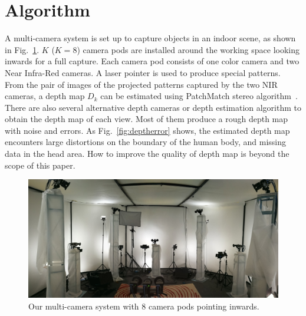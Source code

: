 \section{Algorithm}
\label{sec:overview}

A multi-camera system is set up to capture objects in an indoor scene, as shown in Fig.~\ref{fig:rig}.
%
$K$ ($K=8$) camera pods are installed around the working space looking inwards for a full capture.
Each camera pod consists of one color camera and two Near Infra-Red cameras. A laser pointer is used to produce special patterns. From the pair of images of the projected patterns captured by the two NIR cameras, a depth map $D_k$ can be estimated using PatchMatch stereo algorithm~\cite{Bleyer2011PatchMatch}.
There are also several alternative depth cameras or depth estimation algorithm to obtain the depth map of each view. Most of them produce a rough depth map with noise and errors.
As Fig.~\ref{fig:deptherror} shows, the estimated depth map encounters large distortions on the boundary of the human body, and missing data in the head area.
How to improve the quality of depth map is beyond the scope of this paper.

\begin{figure}
	\centering
	\includegraphics[width=\columnwidth]{image/rig.jpg}
	\caption{Our multi-camera system with 8 camera pods pointing inwards.}
	\label{fig:rig}
\end{figure}



